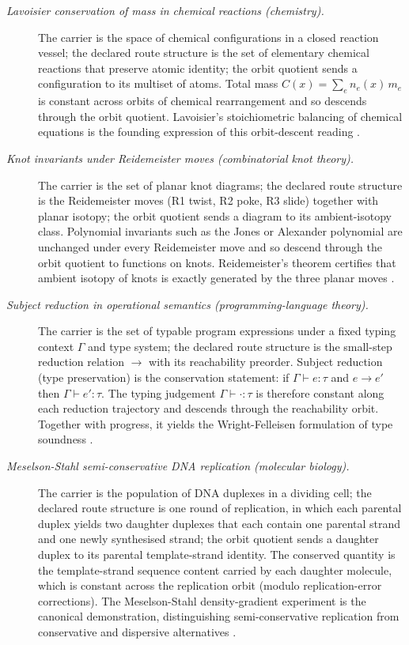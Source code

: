 \documentclass[11pt]{article}
\theoremstyle{definition}
\begin{document}
\begin{description}
\item[\emph{Lavoisier conservation of mass in chemical
reactions (chemistry).}]
The carrier is the space of chemical configurations in
a closed reaction vessel; the declared route structure
is the set of elementary chemical reactions that
preserve atomic identity; the orbit quotient sends a
configuration to its multiset of atoms.  Total mass
\(C(x)=\sum_e n_e(x)\,m_e\) is constant across orbits
of chemical rearrangement and so descends through the
orbit quotient.  Lavoisier's stoichiometric balancing
of chemical equations is the founding expression of
this orbit-descent reading \citep{Lavoisier1789Traite}.

\item[\emph{Knot invariants under Reidemeister moves
(combinatorial knot theory).}]
The carrier is the set of planar knot diagrams; the
declared route structure is the Reidemeister moves (R1
twist, R2 poke, R3 slide) together with planar isotopy;
the orbit quotient sends a diagram to its
ambient-isotopy class.  Polynomial invariants such as
the Jones or Alexander polynomial are unchanged under
every Reidemeister move and so descend through the
orbit quotient to functions on knots.  Reidemeister's
theorem certifies that ambient isotopy of knots is
exactly generated by the three planar moves
\citep{Reidemeister1927Knotentheorie}.

\item[\emph{Subject reduction in operational semantics
(programming-language theory).}]
The carrier is the set of typable program expressions
under a fixed typing context \(\Gamma\) and type
system; the declared route structure is the small-step
reduction relation \(\to\) with its reachability
preorder.  Subject reduction (type preservation) is the
conservation statement: if
\(\Gamma\vdash e:\tau\) and \(e\to e'\) then
\(\Gamma\vdash e':\tau\).  The typing judgement
\(\Gamma\vdash\cdot:\tau\) is therefore constant along
each reduction trajectory and descends through the
reachability orbit.  Together with progress, it yields
the Wright-Felleisen formulation of type soundness
\citep{WrightFelleisen1994SyntacticTypeSoundness}.

\item[\emph{Meselson-Stahl semi-conservative {DNA}
replication (molecular biology).}]
The carrier is the population of DNA duplexes in a
dividing cell; the declared route structure is one
round of replication, in which each parental duplex
yields two daughter duplexes that each contain one
parental strand and one newly synthesised strand; the
orbit quotient sends a daughter duplex to its parental
template-strand identity.  The conserved quantity is
the template-strand sequence content carried by each
daughter molecule, which is constant across the
replication orbit (modulo replication-error
corrections).  The Meselson-Stahl density-gradient
experiment is the canonical demonstration,
distinguishing semi-conservative replication from
conservative and dispersive alternatives
\citep{MeselsonStahl1958Replication}.


\end{description}
\end{document}
